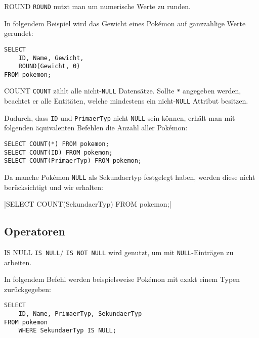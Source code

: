\begin{bonus}{ROUND}
    \texttt{ROUND} nutzt man um numerische Werte zu runden.

    In folgendem Beispiel wird das Gewicht eines Pokémon auf ganzzahlige Werte gerundet:

    \begin{verbatim}
SELECT
    ID, Name, Gewicht,
    ROUND(Gewicht, 0)
FROM pokemon;
    \end{verbatim}

    
\end{bonus}

\begin{bonus}{COUNT}
    \texttt{COUNT} zählt alle nicht-\texttt{NULL} Datensätze.
    Sollte \texttt{*} angegeben werden, beachtet er alle Entitäten, welche mindestens ein nicht-\texttt{NULL} Attribut besitzen.

    Dudurch, dass \texttt{ID} und \texttt{PrimaerTyp} nicht \texttt{NULL} sein können, erhält man mit folgenden äquivalenten Befehlen die Anzahl aller Pokémon:

    \begin{verbatim}
SELECT COUNT(*) FROM pokemon;
SELECT COUNT(ID) FROM pokemon;
SELECT COUNT(PrimaerTyp) FROM pokemon;
    \end{verbatim}

    

    Da manche Pokémon \texttt{NULL} als Sekundaertyp festgelegt haben, werden diese nicht berücksichtigt und wir erhalten:

    |SELECT COUNT(SekundaerTyp) FROM pokemon;|

    
\end{bonus}

\subsection{Operatoren}

\begin{bonus}{IS NULL}
    \texttt{IS NULL}/ \texttt{IS NOT NULL} wird genutzt, um mit \texttt{NULL}-Einträgen zu arbeiten.

    In folgendem Befehl werden beispielsweise Pokémon mit exakt einem Typen zurückgegeben:

    \begin{verbatim}
SELECT
    ID, Name, PrimaerTyp, SekundaerTyp
FROM pokemon
    WHERE SekundaerTyp IS NULL;
    \end{verbatim}

    
\end{bonus}

